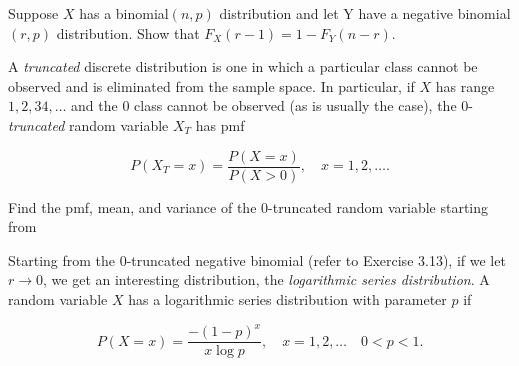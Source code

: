 \documentclass[12pt,letterpaper]{exam}
\begin{document}
\begin{questions}
	\begin{solution}
		
	\end{solution}
	
	\setcounter{question}{11}
	\question 
	Suppose \(X\) has a binomial\((n, p)\) distribution and let Y have a negative binomial\((r, p)\)
	distribution. Show that \(F_X(r-1) = 1-F_Y(n-r)\).
	
	\begin{solution}
		
	\end{solution}
	
	\question 
	A \textit{truncated} discrete distribution is one in which a particular class cannot be observed
	and is eliminated from the sample space. In particular, if \(X\) has range \(1,2,34,\ldots\) and
	the 0 class cannot be observed (as is usually the case), the 0-\textit{truncated} random variable
	\(X_T\) has pmf
	
	\[P(X_T=x) = \frac{P(X=x)}{P(X>0)}, \quad x=1,2,\ldots.\]
	
	Find the pmf, mean, and variance of the 0-truncated random variable starting from
	
	\begin{solution}
		
	\end{solution}
	
	\question 
	Starting from the 0-truncated negative binomial (refer to Exercise 3.13), if we let 
	\(r \rightarrow 0\), we get an interesting distribution, the \textit{logarithmic series distribution}. 
	A random variable \(X\) has a logarithmic series distribution with parameter \(p\) if
	
	\[P(X=x) = \frac{-(1-p)^x}{x\log p}, \quad x=1,2,\ldots \quad 0<p<1.\]
	
	\begin{parts}

\end{parts}
\end{questions}
\end{document}
